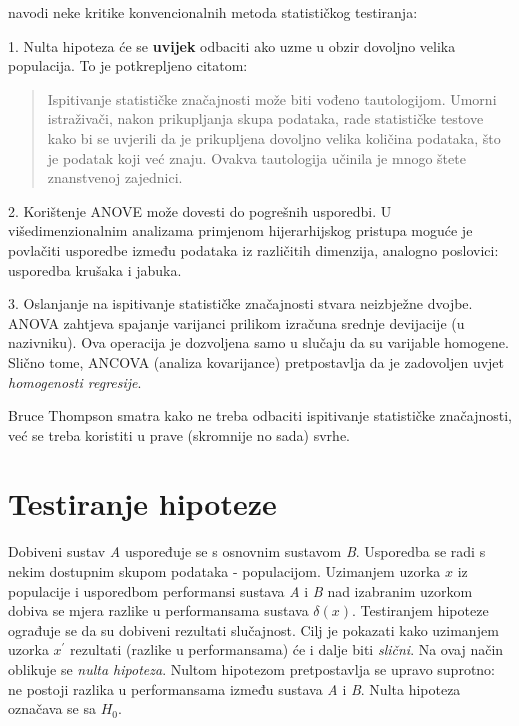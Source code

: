 \citep{thompson1993use} navodi neke kritike konvencionalnih metoda statističkog testiranja:

1. Nulta hipoteza će se \textbf{uvijek} odbaciti ako uzme u obzir dovoljno velika populacija. To je potkrepljeno citatom:
	
\begin{quote}
Ispitivanje statističke značajnosti može biti vođeno tautologijom. Umorni istraživači, nakon prikupljanja skupa podataka, rade statističke testove kako bi se uvjerili da je prikupljena dovoljno velika količina podataka, što je podatak koji već znaju. Ovakva tautologija učinila je mnogo štete znanstvenoj zajednici.
\end{quote}

2. Korištenje ANOVE može dovesti do pogrešnih usporedbi. U višedimenzionalnim analizama primjenom hijerarhijskog pristupa moguće je povlačiti usporedbe između podataka iz različitih dimenzija, analogno poslovici: usporedba krušaka i jabuka. 

3. Oslanjanje na ispitivanje statističke značajnosti stvara neizbježne dvojbe. \\  ANOVA zahtjeva spajanje varijanci prilikom izračuna srednje devijacije (u nazivniku). Ova operacija je dozvoljena samo u slučaju da su varijable homogene. Slično tome, ANCOVA (analiza kovarijance) pretpostavlja da je zadovoljen uvjet \textit{homogenosti regresije}.


Bruce Thompson smatra kako ne treba odbaciti ispitivanje statističke značajnosti, već se treba koristiti u prave (skromnije no sada) svrhe. 

\section{Testiranje hipoteze}

Dobiveni sustav \emph{A} uspoređuje se s osnovnim  sustavom \emph{B}. Usporedba se radi s nekim dostupnim skupom podataka  - populacijom. Uzimanjem uzorka $x$ iz populacije i usporedbom performansi sustava \emph{A} i \emph{B} nad izabranim uzorkom dobiva se mjera razlike u performansama sustava $\delta(x)$. Testiranjem hipoteze ograđuje se da su dobiveni rezultati slučajnost. Cilj je pokazati kako uzimanjem uzorka $x^{'}$ rezultati (razlike u performansama) će i dalje biti \emph{slični}. Na ovaj način oblikuje se \emph{nulta hipoteza}. Nultom hipotezom pretpostavlja se upravo suprotno: ne postoji razlika u performansama između sustava \textit{A} i \textit{B}. Nulta hipoteza označava se sa $H_0$. 

